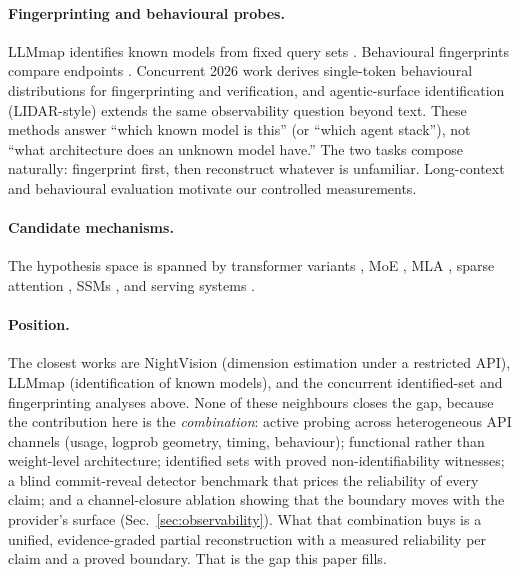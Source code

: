 \paragraph{Fingerprinting and behavioural probes.}  LLMmap identifies known models from
fixed query sets \cite{pasquini2025llmmap}.  Behavioural fingerprints compare endpoints
\cite{pei2025behavioral}.  Concurrent 2026 work derives single-token behavioural
distributions for fingerprinting and verification, and agentic-surface identification
(LIDAR-style) extends the same observability question beyond text.  These methods
answer ``which known model is this'' (or ``which agent stack''), not ``what architecture
does an unknown model have.''  The two tasks compose naturally: fingerprint first, then
reconstruct whatever is unfamiliar.  Long-context and behavioural evaluation
\cite{hsieh2024ruler,liu2024lost,casper2024blackbox,chang2024survey,shevlane2023model}
motivate our controlled measurements.

\paragraph{Candidate mechanisms.}  The hypothesis space is spanned by transformer
variants \cite{vaswani2017attention,shazeer2019fast,ainslie2023gqa,su2024roformer,press2022train},
MoE \cite{shazeer2017outrageously,fedus2022switch,jiang2024mixtral}, MLA
\cite{deepseekai2024v2}, sparse attention \cite{deepseekai2025v32}, SSMs
\cite{gu2022efficiently,dao2024mamba,dao2024transformers}, and serving systems
\cite{dao2022flashattention,kwon2023paged,leviathan2023fast,chen2023accelerating}.

\paragraph{Position.}  The closest works are NightVision (dimension estimation under a
restricted API), LLMmap (identification of known models), and the concurrent
identified-set and fingerprinting analyses above.  None of these neighbours closes the
gap, because the contribution here is the \emph{combination}: active probing across
heterogeneous API channels (usage, logprob geometry, timing, behaviour); functional
rather than weight-level architecture; identified sets with proved non-identifiability
witnesses; a blind commit-reveal detector benchmark that prices the reliability of every
claim; and a channel-closure ablation showing that the boundary moves with the
provider's surface (Sec.~\ref{sec:observability}).  What that combination buys is a
unified, evidence-graded partial reconstruction with a measured reliability per claim
and a proved boundary.  That is the gap this paper fills.

